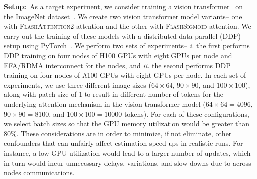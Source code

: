 \noindent\textbf{Setup:}\ As a target experiment, we consider training a vision transformer~\citep{DBLP:conf/iclr/DosovitskiyB0WZ21} on the ImageNet dataset~\citep{DBLP:conf/cvpr/DengDSLL009}. 
We create two vision transformer model variants-- one with \textsc{FlashAttention2} attention and the other with \textsc{FlashSigmoid} attention. 
We carry out the training of these models with a distributed data-parallel (DDP) setup using PyTorch~\citep{DBLP:conf/nips/PaszkeGMLBCKLGA19}. 
We perform two sets of experiments-- \emph{i.} the first performs DDP training on four nodes of H100 GPUs with eight GPUs per node and EFA/RDMA interconnect for the nodes, and \emph{ii.} the second performs DDP training on four nodes of A100 GPUs with eight GPUs per node. 
In each set of experiments, we use three different image sizes ($64\times 64$, $90\times 90$, and $100\times 100$), along with patch size of $1$ to result in different number of tokens for the underlying attention mechanism in the vision transformer model ($64\times 64 = 4096$, $90\times 90 = 8100$, and $100\times 100 = 10000$ tokens).
For each of these configurations, we select batch sizes so that the GPU memory utilization would be greater than $80\%$.
These considerations are in order to minimize, if not eliminate, other confounders that can unfairly affect estimation speed-ups in realistic runs. For instance, a low GPU utilization would lead to a larger number of updates, which in turn would incur unnecessary delays, variations, and slow-downs due to across-nodes communications.

